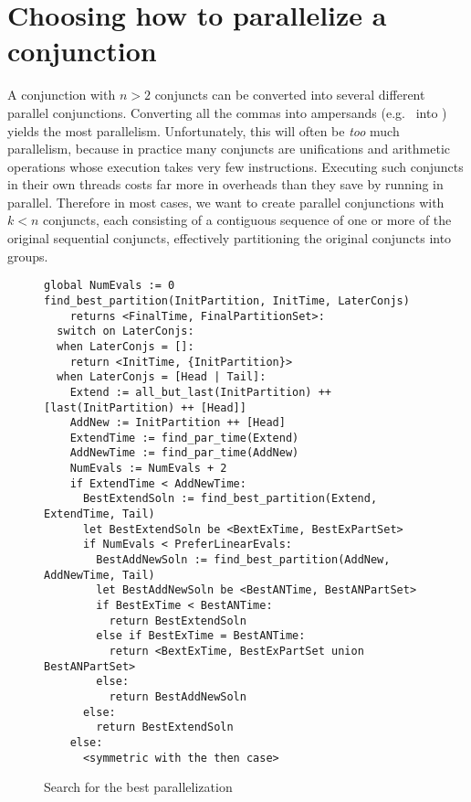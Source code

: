 
\section{Choosing how to parallelize a conjunction}
\label{sec:howto}

A conjunction with $n > 2$ conjuncts
can be converted into several different parallel conjunctions.
Converting all the commas into ampersands
(e.g.\  into )
yields the most parallelism.
Unfortunately, this will often be \emph{too} much parallelism,
because in practice many conjuncts are unifications
and arithmetic operations whose execution takes very few instructions.
Executing such conjuncts in their own threads
costs far more in overheads than they save by running in parallel.
Therefore in most cases,
we want to create parallel conjunctions with $k < n$ conjuncts,
each consisting of a contiguous sequence
of one or more of the original sequential conjuncts,
effectively partitioning the original conjuncts into groups.

\begin{figure}
\begin{center}
\begin{verbatim}
global NumEvals := 0
find_best_partition(InitPartition, InitTime, LaterConjs)
    returns <FinalTime, FinalPartitionSet>:
  switch on LaterConjs:
  when LaterConjs = []:
    return <InitTime, {InitPartition}>
  when LaterConjs = [Head | Tail]:
    Extend := all_but_last(InitPartition) ++ [last(InitPartition) ++ [Head]]
    AddNew := InitPartition ++ [Head]
    ExtendTime := find_par_time(Extend)
    AddNewTime := find_par_time(AddNew)
    NumEvals := NumEvals + 2
    if ExtendTime < AddNewTime:
      BestExtendSoln := find_best_partition(Extend, ExtendTime, Tail)
      let BestExtendSoln be <BextExTime, BestExPartSet>
      if NumEvals < PreferLinearEvals:
        BestAddNewSoln := find_best_partition(AddNew, AddNewTime, Tail)
        let BestAddNewSoln be <BestANTime, BestANPartSet>
        if BestExTime < BestANTime:
          return BestExtendSoln
        else if BestExTime = BestANTime:
          return <BextExTime, BestExPartSet union BestANPartSet>
        else:
          return BestAddNewSoln
      else:
        return BestExtendSoln
    else:
      <symmetric with the then case>
\end{verbatim}
\end{center}
\caption{Search for the best parallelization}
\label{fig:best_par_search}
\end{figure}

